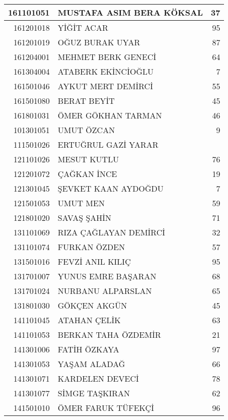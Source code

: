 \documentclass[12pt]{article}
\begin{document}
\begin{longtable}{||r||l||r||}
    \midrule
    161101051 & MUSTAFA ASIM BERA KÖKSAL & 37 \\
    \midrule
    161201018 & YİĞİT ACAR & 95 \\
    \midrule
    161201019 & OĞUZ BURAK UYAR & 87 \\
    \midrule
    161204001 & MEHMET BERK GENECİ & 64 \\
    \midrule
    161304004 & ATABERK EKİNCİOĞLU & 7 \\
    \midrule
    161501046 & AYKUT MERT DEMİRCİ & 55 \\
    \midrule
    161501080 & BERAT BEYİT & 45 \\
    \midrule
    161801031 & ÖMER GÖKHAN TARMAN & 46 \\
    \midrule
    101301051 & UMUT ÖZCAN & 9 \\
    \midrule
    111501026 & ERTUĞRUL GAZİ YARAR &  \\
    \midrule
    121101026 & MESUT KUTLU & 76 \\
    \midrule
    121201072 & ÇAĞKAN İNCE & 19 \\
    \midrule
    121301045 & ŞEVKET KAAN AYDOĞDU & 7 \\
    \midrule
    121501053 & UMUT MEN & 59 \\
    \midrule
    121801020 & SAVAŞ ŞAHİN & 71 \\
    \midrule
    131101069 & RIZA ÇAĞLAYAN DEMİRCİ & 32 \\
    \midrule
    131101074 & FURKAN ÖZDEN & 57 \\
    \midrule
    131501016 & FEVZİ ANIL KILIÇ & 95 \\
    \midrule
    131701007 & YUNUS EMRE BAŞARAN & 68 \\
    \midrule
    131701024 & NURBANU ALPARSLAN & \cellcolor[rgb]{ 1,  1,  0} 65 \\
    \midrule
    131801030 & GÖKÇEN AKGÜN & 45 \\
    \midrule
    141101045 & ATAHAN ÇELİK & 63 \\
    \midrule
    141101053 & BERKAN TAHA ÖZDEMİR & 21 \\
    \midrule
    141301006 & FATİH ÖZKAYA & 97 \\
    \midrule
    141301053 & YAŞAM ALADAĞ & 66 \\
    \midrule
    141301071 & KARDELEN DEVECİ & \cellcolor[rgb]{ 1,  1,  0} 78 \\
    \midrule
    141301077 & SİMGE TAŞKIRAN & 62 \\
    \midrule
    141501010 & ÖMER FARUK TÜFEKÇİ & 96 \\

\end{longtable}
\end{document}
